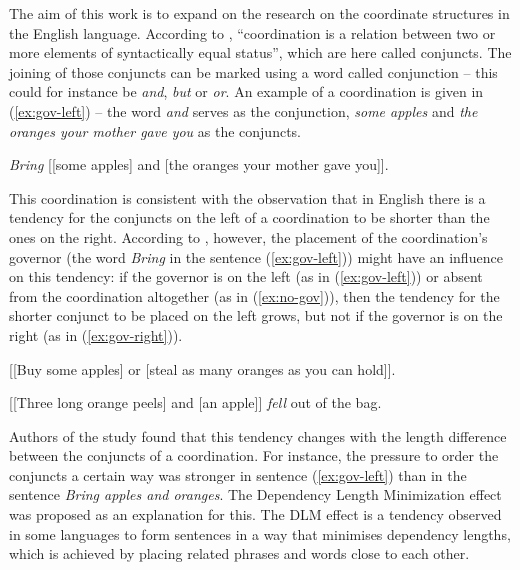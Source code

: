 The aim of this work is to expand on the research on the coordinate structures in the English language. According to \cite[p. 66]{Huddleston-Pullum-2002}, ``coordination is a relation between two or more elements of syntactically equal status'', which are here called conjuncts. The joining of those conjuncts can be marked using a word called conjunction -- this could for instance be \textsl{and}, \textsl{but} or \textsl{or}. An example of a coordination is given in (\ref{ex:gov-left}) -- the word \textsl{and} serves as the conjunction, \textsl{some apples} and \textsl{the oranges your mother gave you} as the conjuncts.

\begin{exe}
    \ex\label{ex:gov-left}
    \textsl{Bring} [[some apples] and [the oranges your mother gave you]].
\end{exe}

This coordination is consistent with the observation that in English there is a tendency for the conjuncts on the left of a coordination to be shorter than the ones on the right. According to \cite{prz:woz:23}, however, the placement of the coordination's governor (the word \textsl{Bring} in the sentence (\ref{ex:gov-left})) might have an influence on this tendency: if the governor is on the left (as in (\ref{ex:gov-left})) or absent from the coordination altogether (as in (\ref{ex:no-gov})), then the tendency for the shorter conjunct to be placed on the left grows, but not if the governor is on the right (as in (\ref{ex:gov-right})).

\begin{exe}
    \ex\label{ex:no-gov}
    [[Buy some apples] or [steal as many oranges as you can hold]].
\end{exe}

\begin{exe}
    \ex\label{ex:gov-right}
    [[Three long orange peels] and [an apple]] \textsl{fell} out of the bag.
\end{exe}

Authors of the study found that this tendency changes with the length difference between the conjuncts of a coordination. For instance, the pressure to order the conjuncts a certain way was stronger in sentence (\ref{ex:gov-left}) than in the sentence \textsl{Bring apples and oranges}. The Dependency Length Minimization effect was proposed as an explanation for this. The DLM effect is a tendency observed in some languages to form sentences in a way that minimises dependency lengths, which is achieved by placing related phrases and words close to each other. 

